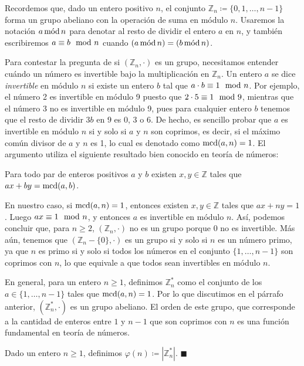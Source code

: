 Recordemos que, dado un entero positivo $n$, el conjunto $\mathbb{Z}_n \coloneq \{0, 1, \dots, n-1\}$ forma un grupo abeliano con la operación de suma en módulo $n$. Usaremos la notación $a \mods n$ para denotar al resto de dividir el entero $a$ en $n$, y también escribiremos $a \equiv b \modl n$ cuando $(a \mods n) = (b \mods n)$.

Para contestar la pregunta de si $(\mathbb{Z}_n, \cdot)$ es un grupo, necesitamos entender cuándo un número es invertible bajo la multiplicación en $\mathbb{Z}_n$. Un entero $a$ se dice \emph{invertible} en módulo $n$ si existe un entero $b$ tal que $a \cdot b \equiv 1 \modl n$. Por ejemplo, el número 2 es invertible en módulo 9
puesto que $2 \cdot 5 \equiv 1 \modl 9$, mientras que el número 3 no es invertible en módulo 9, pues para cualquier entero $b$ tenemos que el resto de dividir $3b$ en $9$ es $0$, $3$ o $6$. De hecho, es sencillo probar que $a$ es
invertible en módulo $n$ si y solo si $a$ y $n$ son coprimos, es decir, si el máximo común divisor de $a$ y $n$ es 1, lo cual es denotado como $\MCD(a,n) = 1$. El argumento utiliza el siguiente resultado bien conocido en teoría de números:

\begin{prop} \label{bezout}
Para todo par de enteros positivos $a$ y $b$ existen $x, y \in \mathbb{Z}$ tales que $ax+by = \MCD(a, b)$.
\end{prop}

En nuestro caso, si $\MCD(a, n) = 1$, entonces existen $x, y \in \mathbb{Z}$ tales que $ax+ny = 1$. Luego $ax \equiv 1 \modl n$, y entonces $a$ es invertible en módulo $n$.
Así, podemos concluir que, para $n \geq 2$,
$(\mathbb{Z}_n, \cdot)$ no es un grupo porque $0$ no es
invertible. Más aún, tenemos que $(\mathbb{Z}_n - \{0\},
\cdot)$ es un grupo si y solo si $n$ es un número primo, ya que $n$ es primo si y solo si todos los números en el conjunto $\{1, \ldots,
n-1\}$ son coprimos con $n$, lo que equivale a que todos sean invertibles en módulo $n$.

En general, para un entero $n \geq 1$, definimos $\mathbb{Z}_n^*$ como el conjunto de los $a \in \{1, \dots, n-1\}$ tales que $\MCD(a, n) = 1$. Por lo que discutimos en el párrafo anterior, $(\mathbb{Z}_n^*, \cdot)$ es un grupo abeliano. El orden de este grupo, que corresponde a la cantidad de enteros entre $1$ y $n-1$ que son coprimos con $n$ es una función fundamental en teoría de números.

\begin{definition}
Dado un entero $n \geq 1$, definimos $\varphi(n) \coloneqq |\mathbb{Z}_n^*|$. \hfill$\blacksquare$
\end{definition}

